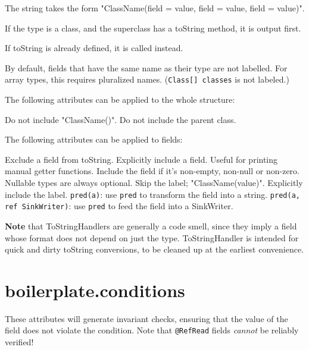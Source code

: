 The string takes the form "ClassName(field = value, field = value, field = value)".

If the type is a class, and the superclass has a toString method, it is output first.

If toString is already defined, it is called instead.

By default, fields that have the same name as their type are not labelled.
For array types, this requires pluralized names. (\lstinline{Class[] classes} is not labeled.)

The following attributes can be applied to the whole structure:
\begin{itemize}\raggedright
{} Do not include "ClassName()".
 Do not include the parent class.
\end{itemize}

The following attributes can be applied to fields:
\begin{itemize}\raggedright
{} Exclude a field from toString.
 Explicitly include a field. Useful for printing manual getter functions.
 Include the field if it's non-empty, non-null or non-zero.
Nullable types are always optional.
 Skip the label; "ClassName(value)".
 Explicitly include the label.
 \lstinline{pred(a)}: use \lstinline{pred} to transform the field into a string.
 \lstinline{pred(a, ref SinkWriter)}: use \lstinline{pred} to feed the field into a
SinkWriter.
\end{itemize}

\textbf{Note} that ToStringHandlers are generally a code smell, since they imply a field whose format does not
depend on just the type. ToStringHandler is intended for quick and dirty toString conversions, to be cleaned up at the
earliest convenience.

\vspace*{\fill}

\section*{boilerplate.conditions}
These attributes will generate invariant checks, ensuring that the value of the field does not
violate the condition. Note that \lstinline{@RefRead} fields \emph{cannot} be reliably verified!

